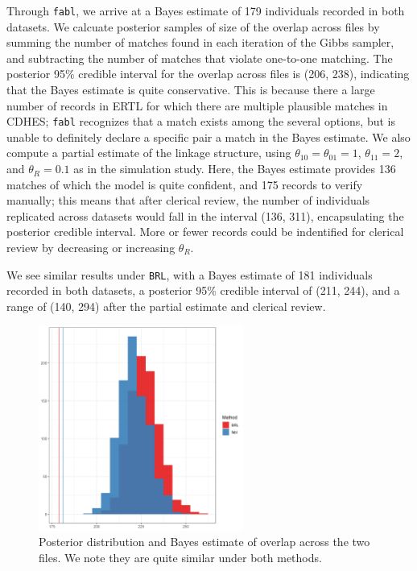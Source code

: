 \documentclass[12pt,letterpaper]{article}
\newcommand{\1}[1]{\mathbb{I}\!\left[#1\right]} %
\begin{document}
Through \texttt{fabl}, we arrive at a Bayes estimate of 179 individuals recorded in both datasets. We calcuate posterior samples of size of the overlap across files by summing the number of matches found in each iteration of the Gibbs sampler, and subtracting the number of matches that violate one-to-one matching. The posterior 95\% credible interval for the overlap across files is (206, 238), indicating that the Bayes estimate is quite conservative. This is because there a large number of records in ERTL for which there are multiple plausible matches in CDHES; \texttt{fabl} recognizes that a match exists among the several options, but is unable to definitely declare a specific pair a match in the Bayes estimate. We also compute a partial estimate of the linkage structure, using $\theta_{10} = \theta_{01} = 1$, $\theta_{11} = 2$, and $\theta_R = 0.1$ as in the simulation study. Here, the Bayes estimate provides 136 matches of which the model is quite confident, and 175 records to verify manually; this means that after clerical review, the number of individuals replicated across datasets would fall in the interval (136, 311), encapsulating the posterior credible interval. More or fewer records could be indentified for clerical review by decreasing or increasing $\theta_R$. 

We see similar results under \texttt{BRL}, with a Bayes estimate of 181 individuals recorded in both datasets, a posterior 95\% credible interval of (211, 244), and a range of (140, 294) after the partial estimate and clerical review. 

\begin{figure}[h!]
	\begin{center}
		\includegraphics[width=0.6\textwidth]{../notes/figures/el_salvador/overlap_distribution_smallP_bayes} 
		\caption{Posterior distribution and Bayes estimate of overlap across the two files. We note they are quite similar under both methods.}
		\label{fig:overlap-plot}
	\end{center}
\end{figure}
\end{document}

